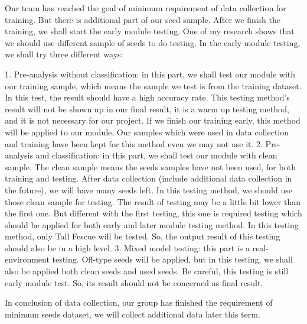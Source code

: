 \documentclass[onecolumn, draftclsnofoot,10pt, compsoc]{IEEEtran}
\begin{document}
Our team has reached the goal of minimum requirement of data collection for training. But there is additional part of our seed sample. After we finish the training, we shall start the early module testing. One of my research shows that we should use different sample of seeds to do testing. In the early module testing, we shall try three different ways:

1.	Pre-analysis without classification: in this part, we shall test our module with our training sample, which means the sample we test is from the training dataset. In this test, the result should have a high accuracy rate. This testing method’s result will not be shown up in our final result, it is a warm up testing method, and it is not necessary for our project. If we finish our training early, this method will be applied to our module. Our samples which were used in data collection and training have been kept for this method even we may not use it.
2.	Pre-analysis and classification: in this part, we shall test our module with clean sample. The clean sample means the seeds samples have not been used, for both training and testing. After data collection (include additional data collection in the future), we will have many seeds left. In this testing method, we should use those clean sample for testing. The result of testing may be a little bit lower than the first one. But different with the first testing, this one is required testing which should be applied for both early and later module testing method. In this testing method, only Tall Fescue will be tested. So, the output result of this testing should also be in a high level.
3.	Mixed model testing: this part is a real-environment testing. Off-type seeds will be applied, but in this testing, we shall also be applied both clean seeds and used seeds. Be careful, this testing is still early module test. So, its result should not be concerned as final result.

In conclusion of data collection, our group has finished the requirement of minimum seeds dataset, we will collect additional data later this term.
\end{document}
